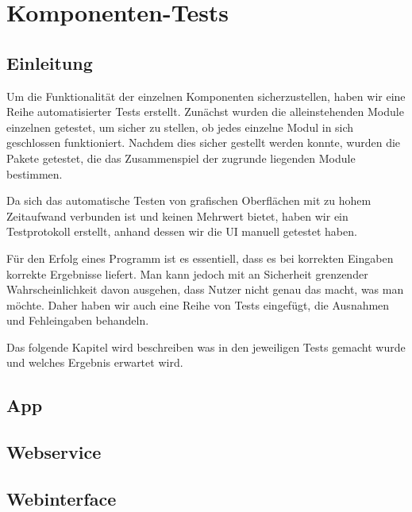 \section{Komponenten-Tests}

\subsection{Einleitung}
Um die Funktionalität der einzelnen Komponenten sicherzustellen, haben wir eine Reihe automatisierter Tests erstellt. Zunächst wurden die alleinstehenden Module einzelnen getestet, um sicher zu stellen, ob jedes einzelne Modul in sich geschlossen funktioniert. Nachdem dies sicher gestellt werden konnte, wurden die Pakete getestet, die das Zusammenspiel der zugrunde liegenden Module bestimmen.\par
Da sich das automatische Testen von grafischen Oberflächen mit zu hohem Zeitaufwand verbunden ist und keinen Mehrwert bietet, haben wir ein Testprotokoll erstellt, anhand dessen wir die UI manuell getestet haben.\par
Für den Erfolg eines Programm ist es essentiell, dass es bei korrekten Eingaben korrekte Ergebnisse liefert. Man kann jedoch mit an Sicherheit grenzender Wahrscheinlichkeit davon ausgehen, dass Nutzer nicht genau das macht, was man möchte. Daher haben wir auch eine Reihe von Tests eingefügt, die Ausnahmen und Fehleingaben behandeln.\par
Das folgende Kapitel wird beschreiben was in den jeweiligen Tests gemacht wurde und welches Ergebnis erwartet wird.

\newpage
\subsection{App}

\newpage
\subsection{Webservice}

\newpage
\subsection{Webinterface}
